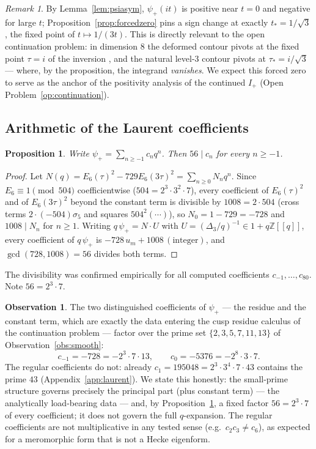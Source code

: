 \documentclass[11pt,reqno]{amsart}
\theoremstyle{plain}
\newtheorem{proposition}[theorem]{Proposition}
\theoremstyle{definition}
\newtheorem{observation}[theorem]{Observation}
\theoremstyle{remark}
\newtheorem{remark}[theorem]{Remark}
\newcommand{\Z}{\mathbb{Z}}
\newcommand{\Dthree}{\Delta_{3}}
\newcommand{\psip}{\psi_{+}}
\newcommand{\Ip}{I_{+}}
\begin{document}
\begin{remark}\label{rem:zerorelevance}
By Lemma~\ref{lem:psiasym}, $\psip(it)$ is positive near $t=0$ and
negative for large $t$; Proposition~\ref{prop:forcedzero} pins a sign
change at exactly $t_*=1/\sqrt3$, the fixed point of
$t\mapsto1/(3t)$.  This is directly relevant to the open continuation
problem: in dimension $8$ the deformed contour pivots at the fixed
point $\tau=i$ of the inversion \cite[\S7]{Viazovska2017}, and the
natural level-$3$ contour pivots at $\tau_*=i/\sqrt3$ --- where, by
the proposition, the integrand \emph{vanishes}.  We expect this forced
zero to serve as the anchor of the positivity analysis of the
continued $\Ip$ (Open Problem~\ref{op:continuation}).
\end{remark}

\subsection{Arithmetic of the Laurent coefficients}
\label{subsec:laurentarith}

\begin{proposition}\label{prop:fiftysix}
Write $\psip=\sum_{n\ge-1}c_n q^n$.  Then $56\mid c_n$ for every
$n\ge-1$.
\end{proposition}

\begin{proof}
Let $N(q)=E_6(\tau)^2-729E_6(3\tau)^2=\sum_{n\ge0}N_nq^n$.  Since
$E_6\equiv1\pmod{504}$ coefficientwise ($504=2^3\cdot3^2\cdot7$),
every coefficient of $E_6(\tau)^2$ and of $E_6(3\tau)^2$ beyond the
constant term is divisible by $1008=2\cdot504$
(cross terms $2\cdot(-504)\sigma_5$ and squares $504^2(\cdots)$), so
$N_0=1-729=-728$ and $1008\mid N_n$ for $n\ge1$.  Writing
$q\,\psip=N\cdot U$ with
$U=(\Dthree/q)^{-1}\in1+q\Z[[q]]$, every coefficient of $q\,\psip$ is
$-728\,u_m+1008\,(\text{integer})$, and
$\gcd(728,1008)=56$ divides both terms.
\end{proof}

The divisibility was confirmed empirically for all computed
coefficients $c_{-1},\dots,c_{80}$.  Note $56=2^3\cdot7$.

\begin{observation}\label{obs:alphabet}
The two distinguished coefficients of $\psip$ --- the residue and the
constant term, which are exactly the data entering the cusp residue
calculus of the continuation problem --- factor over the prime set
$\{2,3,5,7,11,13\}$ of Observation~\ref{obs:smooth}:
\[
c_{-1}=-728=-2^3\cdot7\cdot13,
\qquad
c_0=-5376=-2^8\cdot3\cdot7 .
\]
The regular coefficients do not: already
$c_1=195048=2^3\cdot3^4\cdot7\cdot43$ contains the prime $43$
(Appendix~\ref{app:laurent}).  We state this honestly: the small-prime
structure governs precisely the principal part (plus constant term)
--- the analytically load-bearing data --- and, by
Proposition~\ref{prop:fiftysix}, a fixed factor $56=2^3\cdot7$ of
every coefficient; it does not govern the full $q$-expansion.  The
regular coefficients are not multiplicative in any tested sense
(e.g.\ $c_2c_3\ne c_6$), as expected for a meromorphic form that is
not a Hecke eigenform.
\end{observation}
\end{document}
